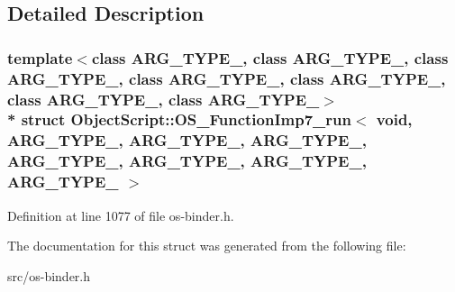 \subsection{Detailed Description}
\subsubsection*{template$<$class A\+R\+G\+\_\+\+T\+Y\+P\+E\+\_, class A\+R\+G\+\_\+\+T\+Y\+P\+E\+\_, class A\+R\+G\+\_\+\+T\+Y\+P\+E\+\_, class A\+R\+G\+\_\+\+T\+Y\+P\+E\+\_, class A\+R\+G\+\_\+\+T\+Y\+P\+E\+\_, class A\+R\+G\+\_\+\+T\+Y\+P\+E\+\_, class A\+R\+G\+\_\+\+T\+Y\+P\+E\+\_$>$\\*
struct Object\+Script\+::\+O\+S\+\_\+\+Function\+Imp7\+\_\+run$<$ void,   A\+R\+G\+\_\+\+T\+Y\+P\+E\+\_, A\+R\+G\+\_\+\+T\+Y\+P\+E\+\_, A\+R\+G\+\_\+\+T\+Y\+P\+E\+\_, A\+R\+G\+\_\+\+T\+Y\+P\+E\+\_, A\+R\+G\+\_\+\+T\+Y\+P\+E\+\_, A\+R\+G\+\_\+\+T\+Y\+P\+E\+\_, A\+R\+G\+\_\+\+T\+Y\+P\+E\+\_ $>$}



Definition at line 1077 of file os-\/binder.\+h.



The documentation for this struct was generated from the following file\+:\begin{DoxyCompactItemize}
\item 
src/os-\/binder.\+h\end{DoxyCompactItemize}

